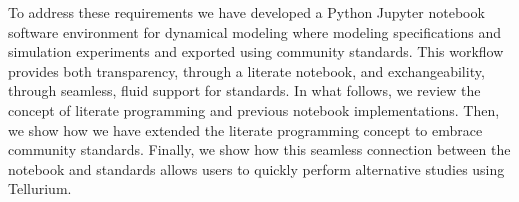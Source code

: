 \documentclass[10pt,letterpaper]{article}
\begin{document}
To address these requirements we have developed a Python Jupyter notebook software environment for dynamical modeling where modeling specifications and simulation experiments and exported using community standards. This workflow %
provides both transparency, through a literate notebook, and exchangeability, through seamless, fluid support for standards. In what follows, we review the concept of literate programming and previous notebook implementations. Then, we show how we have extended the literate programming concept to embrace community standards. Finally, we show how this seamless connection between the notebook and standards allows users to quickly perform alternative studies using Tellurium.


\end{document}
